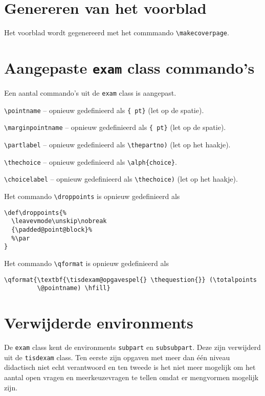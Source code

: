 \documentclass[12pt,dutch,addpoints,fleqn]{tisdexam}
\newcommand\Package[1]{\texttt{#1}}
\newcommand\DocClass[1]{\texttt{#1}}
\begin{document}
\section{Genereren van het voorblad}

Het voorblad wordt gegenereerd met het commmando \verb|\makecoverpage|.
%
%

\section{Aangepaste \DocClass{exam} class commando's}
Een aantal commando's uit de \DocClass{exam} class is aangepast.

\verb|\pointname| -- opnieuw gedefinieerd als \verb|{ pt}| (let op de spatie).

\verb|\marginpointname| -- opnieuw gedefinieerd als \verb|{ pt}| (let op de spatie).

\verb|\partlabel| -- opnieuw gedefinieerd als \verb|\thepartno)| (let op het haakje).

\verb|\thechoice| -- opnieuw gedefinieerd als \verb|\alph{choice}|.

\verb|\choicelabel| -- opnieuw gedefinieerd als \verb|\thechoice)| (let op het haakje).

Het commando \verb|\droppoints| is opnieuw gedefinieerd als

\begin{lstlisting}
\def\droppoints{%
  \leavevmode\unskip\nobreak
  {\padded@point@block}%
  %\par
}
\end{lstlisting}

Het commando \verb|\qformat| is opnieuw gedefinieerd als

\begin{lstlisting}
\qformat{\textbf{\tisdexam@opgavespel{} \thequestion{}} (\totalpoints
         \@pointname) \hfill}
\end{lstlisting}


\section{Verwijderde environments}
De \DocClass{exam} class kent de environments \Package{subpart} en
\Package{subsubpart}. Deze zijn verwijderd uit de \DocClass{tisdexam} class.
Ten eerste zijn opgaven met meer dan \'{e}\'{e}n niveau didactisch niet
echt verantwoord en ten tweede is het niet meer mogelijk om het aantal
open vragen en meerkeuzevragen te tellen omdat er mengvormen mogelijk zijn.
\end{document}
